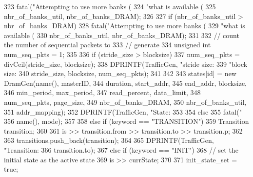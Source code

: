 \begin{DoxyCode}
{{{{{{323                             fatal("Attempting to use more banks (%
324                                   "what is available (%
325                                   nbr_of_banks_util, nbr_of_banks_DRAM);
326 
327                         if (nbr_of_banks_util > nbr_of_banks_DRAM)
328                             fatal("Attempting to use more banks (%
329                                   "what is available (%
330                                   nbr_of_banks_util, nbr_of_banks_DRAM);
331 
332                         // count the number of sequential packets to
333                         // generate
334                         unsigned int num_seq_pkts = 1;
335 
336                         if (stride_size > blocksize) {
337                             num_seq_pkts = divCeil(stride_size, blocksize);
338                             DPRINTF(TrafficGen, "stride size: %
339                                     "block size: %
340                                     stride_size, blocksize, num_seq_pkts);
341                         }
342 
343                         states[id] = new DramGen(name(), masterID,
344                                                  duration, start_addr,
345                                                  end_addr, blocksize,
346                                                  min_period, max_period,
347                                                  read_percent, data_limit,
348                                                  num_seq_pkts, page_size,
349                                                  nbr_of_banks_DRAM,
350                                                  nbr_of_banks_util,
351                                                  addr_mapping);
352                         DPRINTF(TrafficGen, "State: %
353                     }
354                 } else {
355                     fatal("%
356                           name(), mode);
357                 }
358             } else if (keyword == "TRANSITION") {
359                 Transition transition;
360 
361                 is >> transition.from >> transition.to >> transition.p;
362 
363                 transitions.push_back(transition);
364 
365                 DPRINTF(TrafficGen, "Transition: %
366                         transition.to);
367             } else if (keyword == "INIT") {
368                 // set the initial state as the active state
369                 is >> currState;
370 
371                 init_state_set = true;
}}}}
\end{DoxyCode}
